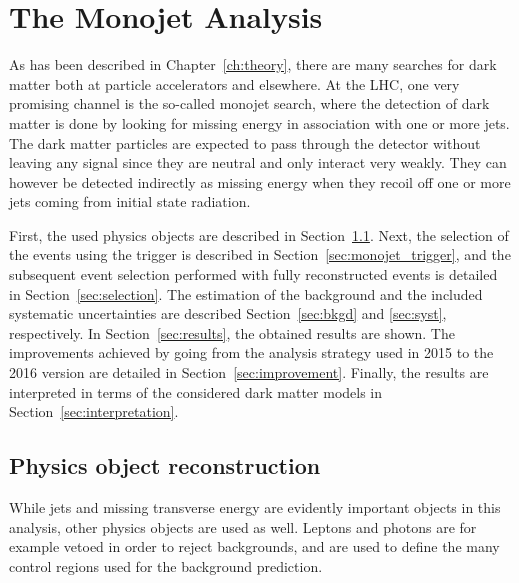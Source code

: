 \graphicspath{{chapt_dutch/}{intro/}{monojet/}}

\renewcommand\evenpagerightmark{{\scshape\small Chapter 5}}
\renewcommand\oddpageleftmark{{\scshape\small The Monojet Analysis}}

\hyphenation{}

\chapter{The Monojet Analysis}
\label{ch:monojet}

As has been described in Chapter~\ref{ch:theory}, there are many searches for dark matter both at particle accelerators and elsewhere. At the \ac{LHC}, one very promising channel is the so-called monojet search, where the detection of dark matter is done by looking for missing energy in association with one or more jets. The dark matter particles are expected to pass through the detector without leaving any signal since they are neutral and only interact very weakly. They can however be detected indirectly as missing energy when they recoil off one or more jets coming from initial state radiation.

First, the used physics objects are described in Section~\ref{sec:monojet_objects}. Next, the selection of the events using the trigger is described in Section~\ref{sec:monojet_trigger}, and the subsequent event selection performed with fully reconstructed events is detailed in Section~\ref{sec:selection}. The estimation of the background and the included systematic uncertainties are described Section~\ref{sec:bkgd} and \ref{sec:syst}, respectively. In Section~\ref{sec:results}, the obtained results are shown. The improvements achieved by going from the analysis strategy used in 2015 to the 2016 version are detailed in Section~\ref{sec:improvement}. Finally, the results are interpreted in terms of the considered dark matter models in Section~\ref{sec:interpretation}.


\section{Physics object reconstruction}
\label{sec:monojet_objects}

While jets and missing transverse energy are evidently important objects in this analysis, other physics objects are used as well. Leptons and photons are for example vetoed in order to reject backgrounds, and are used to define the many control regions used for the background prediction. 

